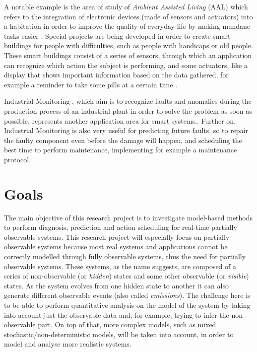 \documentclass{article}
\begin{document}
        A notable example is the area of study of \textit{Ambient Assisted Living} (AAL) which refers to the integration of electronic devices (made of sensors and actuators) into a habitation in order to improve the quality of everyday life by making mundane tasks easier \cite{wadhawan2005smart, cook2009ambient}. Special projects are being developed in order to create smart buildings for people with difficulties, such as people with handicaps or old people. These smart buildings consist of a series of sensors, through which an application can recognize which action the subject is performing, and some actuators, like a display that shows important information based on the data gathered, for example a reminder to take some pills at a certain time \cite{carnevali2015continuous, epew16}.
        
        Industrial Monitoring \cite{chiang2001fault}, which aim is to recognize faults and anomalies during the production process of an industrial plant in order to solve the problem as soon as possible, represents another application area for smart systems.. Further on, Industrial Monitoring is also very useful for predicting future faults, so to repair the faulty component even before the damage will happen, and scheduling the best time to perform maintenance, implementing for example a maintenance protocol.
        
    \section*{Goals}
    
        The main objective of this research project is to investigate model-based methods to perform diagnosis, prediction and action scheduling for real-time partially observable systems. This research project will especially focus on partially observable systems because most real systems and applications cannot be correctly modelled through fully observable systems, thus the need for partially observable systems. These systems, as the name suggests, are composed of a series of non-observable (or \textit{hidden}) states and some other observable (or \textit{visible}) states. As the system evolves from one hidden state to another it can also generate different observable events (also called \textit{emissions}). The challenge here is to be able to perform quantitative analysis on the model of the system by taking into account just the observable data and, for example, trying to infer the non-observable part. On top of that, more complex models, such as mixed stochastic/non-deterministic models, will be taken into account, in order to model and analyse more realistic systems.
        
\end{document}
